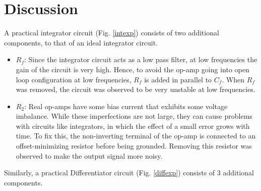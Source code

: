 \section{Discussion}

A practical integrator circuit (Fig. \ref{intexp}) consists of two additional components, to that of an ideal integrator circuit.\\

\begin{itemize}
    \item $R_f$: Since the integrator circuit acts as a low pass filter, at low frequencies the gain of the circuit is very high. Hence, to avoid the op-amp going into open loop configuration at low frequencies, $R_f$ is added in parallel to $C_f$. When $R_f$ was removed, the circuit was observed to be very unstable at low frequencies.\\
    \item $R_2$: Real op-amps have some bias current that exhibits some voltage imbalance. While these imperfections are not large, they can cause problems with circuits like integrators, in which the effect of a small error grows with time. To fix this, the non-inverting terminal of the op-amp is connected to an offset-minimizing resistor before being grounded. Removing this resistor was observed to make the output signal more noisy.\\
\end{itemize}

Similarly, a practical Differentiator circuit (Fig. \ref{diffexp}) consists of 3 additional components.\\

